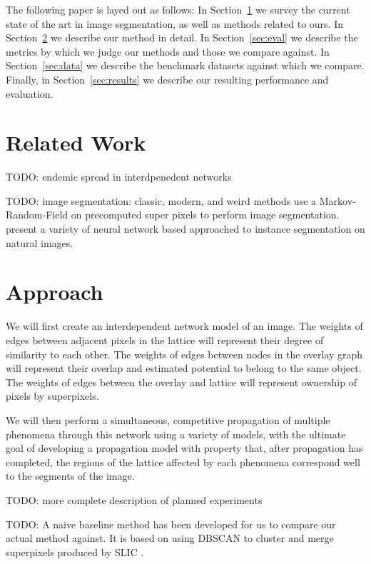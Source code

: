 \documentclass[twocolumn]{article}
\newcommand{\todo}[1]{}
\renewcommand{\todo}[1]{{\color{red} TODO: {#1}}}
\newcommand{\secref}[1]{Section~\ref{sec:#1}}
\newcommand{\seclab}[1]{\label{sec:#1}}
\begin{document}
The following paper is layed out as follows: In \secref{related} we survey the current state of the art in image segmentation,
as well as methods related to ours. In \secref{approach} we describe our method in detail. In \secref{eval} we describe the
metrics by which we judge our methods and those we compare against. In \secref{data} we describe the benchmark datasets
against which we compare. Finally, in \secref{results} we describe our resulting performance and evaluation.

\section{Related Work}\seclab{related}

\todo{endemic spread in interdpenedent networks}

\todo{image segmentation: classic, modern, and weird methods}
\cite{pei2014saliency} use a Markov-Random-Field on precomputed super pixels to perform image segmentation.
\cite{newell2017associative,li2017fully,ren2017end} present a variety of neural network based approached to instance
segmentation on natural images.

\section{Approach}\seclab{approach}

We will first create an interdependent network model of an image. The weights of edges between adjacent pixels in the lattice
will represent their degree of similarity to each other. The weights of edges between nodes in the overlay graph will
represent their overlap and estimated potential to belong to the same object. The weights of edges between the overlay and
lattice will represent ownership of pixels by superpixels.

We will then perform a simultaneous, competitive propagation of multiple phenomena through this network using a variety of
models, with the ultimate goal of developing a propagation model with property that, after propagation has completed, the
regions of the lattice affected by each phenomena correspond well to the segments of the image.

\todo{more complete description of planned experiments}

\todo{
A naive baseline method has been developed for us to compare our actual method against. It is based on using DBSCAN
\cite{ester1996density} to cluster and merge superpixels produced by SLIC \cite{achanta2010slic}.
}
\end{document}
